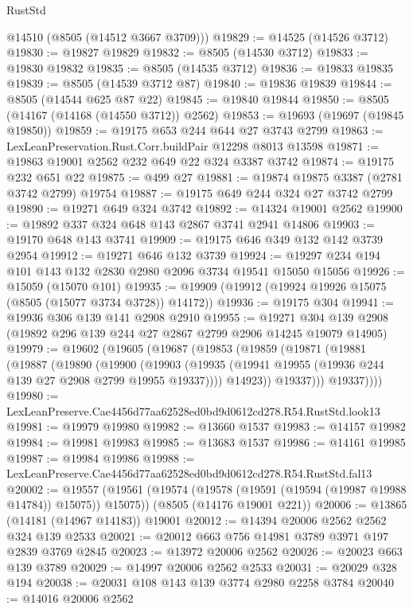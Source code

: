\begin{lexlean}{RustStd}
\begin{coremodule}
      @14510
      (@8505 (@14512 @3667 @3709)))
@19829 := @14525 (@14526 @3712)
@19830 := @19827 @19829
@19832 := @8505 (@14530 @3712)
@19833 := @19830 @19832
@19835 := @8505 (@14535 @3712)
@19836 := @19833 @19835
@19839 := @8505 (@14539 @3712 @87)
@19840 := @19836 @19839
@19844 := @8505 (@14544 @625 @87 @22)
@19845 := @19840 @19844
@19850 := @8505 (@14167 (@14168 (@14550 @3712)) @2562)
@19853 := @19693 (@19697 (@19845 @19850))
@19859 := @19175 @653 @244 @644 @27 @3743 @2799
@19863 := LexLeanPreservation.Rust.Corr.buildPair @12298 @8013 @13598
@19871 := @19863 @19001 @2562 @232 @649 @22 @324 @3387 @3742
@19874 := @19175 @232 @651 @22
@19875 := @499 @27
@19881 := @19874 @19875 @3387 (@2781 @3742 @2799) @19754
@19887 := @19175 @649 @244 @324 @27 @3742 @2799
@19890 := @19271 @649 @324 @3742
@19892 := @14324 @19001 @2562
@19900 := @19892 @337 @324 @648 @143 @2867 @3741 @2941 @14806
@19903 := @19170 @648 @143 @3741
@19909 := @19175 @646 @349 @132 @142 @3739 @2954
@19912 := @19271 @646 @132 @3739
@19924 := @19297 @234 @194 @101 @143 @132 @2830 @2980 @2096 @3734 @19541 @15050 @15056
@19926 := @15059 (@15070 @101)
@19935 := @19909 (@19912 (@19924 @19926 @15075 (@8505 (@15077 @3734 @3728)) @14172))
@19936 := @19175 @304
@19941 := @19936 @306 @139 @141 @2908 @2910
@19955 := @19271 @304 @139 @2908 (@19892 @296 @139 @244 @27 @2867 @2799 @2906 @14245 @19079 @14905)
@19979 := @19602
    (@19605
      (@19687
        (@19853
          (@19859
            (@19871
              (@19881
                (@19887
                  (@19890
                    (@19900
                      (@19903
                        (@19935 (@19941 @19955 (@19936 @244 @139 @27 @2908 @2799 @19955 @19337))))
                      @14923))
                  @19337)))
            @19337))))
@19980 := LexLeanPreserve.Cae4456d77aa62528ed0bd9d0612cd278.R54.RustStd.look13
@19981 := @19979 @19980
@19982 := @13660 @1537
@19983 := @14157 @19982
@19984 := @19981 @19983
@19985 := @13683 @1537
@19986 := @14161 @19985
@19987 := @19984 @19986
@19988 := LexLeanPreserve.Cae4456d77aa62528ed0bd9d0612cd278.R54.RustStd.fal13
@20002 := @19557
    (@19561 (@19574 (@19578 (@19591 (@19594 (@19987 @19988 @14784)) @15075)) @15075))
    (@8505 (@14176 @19001 @221))
@20006 := @13865 (@14181 (@14967 @14183)) @19001
@20012 := @14394 @20006 @2562 @2562 @324 @139 @2533
@20021 := @20012 @663 @756 @14981 @3789 @3971 @197 @2839 @3769 @2845
@20023 := @13972 @20006 @2562
@20026 := @20023 @663 @139 @3789
@20029 := @14997 @20006 @2562 @2533
@20031 := @20029 @328 @194
@20038 := @20031 @108 @143 @139 @3774 @2980 @2258 @3784
@20040 := @14016 @20006 @2562

\end{coremodule}
\end{lexlean}

